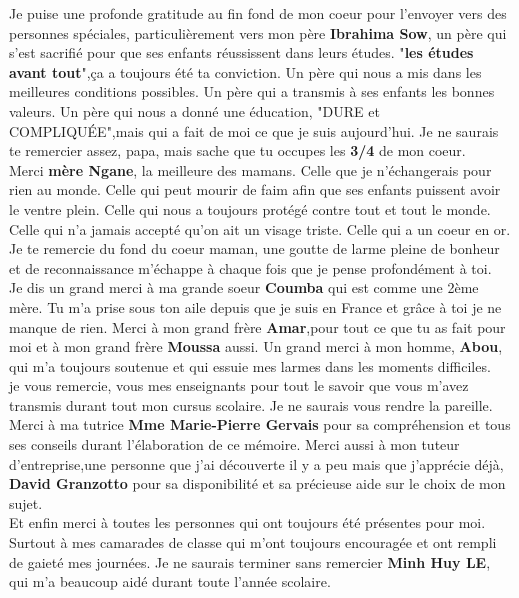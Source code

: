 \documentclass[12pt]{report}
\begin{document}
\hspace{1cm} Je puise une profonde gratitude au fin fond de  mon coeur pour l'envoyer vers des personnes spéciales, particulièrement vers mon père \textbf{Ibrahima Sow}, un père qui s'est sacrifié pour que ses enfants réussissent dans leurs études. "\textbf{les études avant tout}",ça a toujours été ta conviction. Un père qui nous a mis dans les meilleures conditions possibles. Un père qui a transmis à ses enfants les bonnes valeurs. Un père qui nous a donné une éducation, "DURE et COMPLIQUÉE",mais qui a fait de moi ce que je suis aujourd'hui. Je ne saurais te remercier assez, papa, mais sache que tu occupes les \textbf{3/4} de mon coeur.\\

\hspace{1cm} Merci \textbf{mère Ngane}, la meilleure des mamans. Celle que je n'échangerais pour rien au monde. Celle qui peut mourir de faim afin que ses enfants puissent avoir le ventre plein. Celle qui nous a toujours protégé contre tout et tout le monde. Celle qui n'a jamais accepté qu'on ait un visage triste. Celle qui a un coeur en or. Je te remercie du fond du coeur maman, une goutte de larme pleine de bonheur et de reconnaissance m'échappe à chaque fois que je pense profondément à toi.\\

\hspace{1cm} Je dis un grand merci à ma grande soeur \textbf{Coumba} qui est comme une 2ème mère. Tu m'a prise sous ton aile depuis que je suis en France et grâce à toi je ne manque de rien. Merci à mon grand frère \textbf{Amar},pour tout ce que tu as fait pour moi et à mon grand frère \textbf{Moussa} aussi. Un grand merci à mon homme, \textbf{Abou}, qui m'a toujours soutenue et qui essuie mes larmes dans les moments difficiles.\\

\hspace{1cm} je vous remercie, vous mes enseignants pour tout le savoir que vous m'avez transmis durant tout mon cursus scolaire. Je ne saurais vous rendre la pareille. Merci à ma tutrice \textbf{Mme  Marie-Pierre Gervais} pour sa compréhension et tous ses conseils durant l'élaboration de ce mémoire. Merci aussi à mon tuteur d'entreprise,une personne que j'ai découverte il y a peu mais que j'apprécie déjà, \textbf{David Granzotto} pour sa disponibilité et sa précieuse aide sur le choix de mon sujet.\\ 

\hspace{1cm} Et enfin merci à toutes les personnes qui ont toujours été présentes pour moi. Surtout à mes camarades de classe qui m'ont toujours encouragée et ont rempli de gaieté mes journées. Je ne saurais terminer sans remercier \textbf{Minh Huy LE}, qui m'a beaucoup aidé durant toute l'année scolaire. \\
\end{document}
